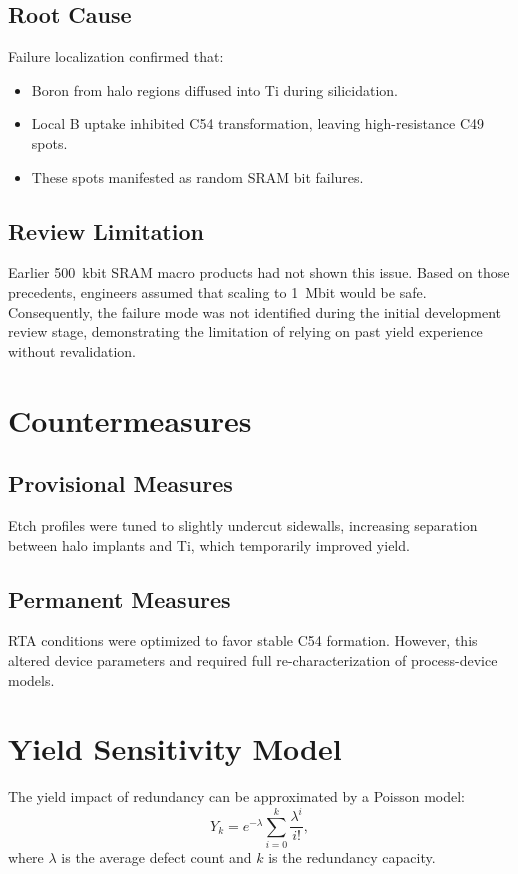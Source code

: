 \documentclass[conference]{IEEEtran}
\begin{document}
\subsection{Root Cause}
Failure localization confirmed that:
\begin{itemize}
    \item Boron from halo regions diffused into Ti during silicidation.
    \item Local B uptake inhibited C54 transformation, leaving high-resistance C49 spots.
    \item These spots manifested as random SRAM bit failures.
\end{itemize}

\subsection{Review Limitation}
Earlier 500~kbit SRAM macro products had not shown this issue. Based on those precedents, engineers assumed that scaling to 1~Mbit would be safe.  
Consequently, the failure mode was not identified during the initial development review stage, demonstrating the limitation of relying on past yield experience without revalidation.

\section{Countermeasures}
\subsection{Provisional Measures}
Etch profiles were tuned to slightly undercut sidewalls, increasing separation between halo implants and Ti, which temporarily improved yield.  

\subsection{Permanent Measures}
RTA conditions were optimized to favor stable C54 formation. However, this altered device parameters and required full re-characterization of process-device models.

\section{Yield Sensitivity Model}
The yield impact of redundancy can be approximated by a Poisson model:
\[
Y_k = e^{-\lambda} \sum_{i=0}^{k} \frac{\lambda^i}{i!},
\]
where $\lambda$ is the average defect count and $k$ is the redundancy capacity.
\end{document}
